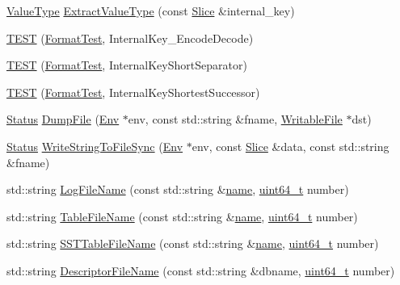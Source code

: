 \begin{DoxyCompactItemize}
\item 
\hyperlink{namespaceleveldb_acc038cb0d608414730cafa459a4ba866}{Value\+Type} \hyperlink{namespaceleveldb_a0c5a6ea40d7c0e87060a6e6d3ee393ec}{Extract\+Value\+Type} (const \hyperlink{classleveldb_1_1_slice}{Slice} \&internal\+\_\+key)
\item 
\hyperlink{namespaceleveldb_a0cb5db14747e016f18aa8684a485bc00}{T\+E\+S\+T} (\hyperlink{classleveldb_1_1_format_test}{Format\+Test}, Internal\+Key\+\_\+\+Encode\+Decode)
\item 
\hyperlink{namespaceleveldb_a88307bc8d4ac8ed2a4d1a530b24e255f}{T\+E\+S\+T} (\hyperlink{classleveldb_1_1_format_test}{Format\+Test}, Internal\+Key\+Short\+Separator)
\item 
\hyperlink{namespaceleveldb_abfb19a8fcd10a881d34dba3821434415}{T\+E\+S\+T} (\hyperlink{classleveldb_1_1_format_test}{Format\+Test}, Internal\+Key\+Shortest\+Successor)
\item 
\hyperlink{classleveldb_1_1_status}{Status} \hyperlink{namespaceleveldb_a119202f6323172b2ac45eae5baf7202f}{Dump\+File} (\hyperlink{classleveldb_1_1_env}{Env} $\ast$env, const std\+::string \&fname, \hyperlink{classleveldb_1_1_writable_file}{Writable\+File} $\ast$dst)
\item 
\hyperlink{classleveldb_1_1_status}{Status} \hyperlink{namespaceleveldb_aaa2ccf468819a9d769dd0bf38674a6e9}{Write\+String\+To\+File\+Sync} (\hyperlink{classleveldb_1_1_env}{Env} $\ast$env, const \hyperlink{classleveldb_1_1_slice}{Slice} \&data, const std\+::string \&fname)
\item 
std\+::string \hyperlink{namespaceleveldb_ae5aadcd574cc5186e7821177d44f4c6c}{Log\+File\+Name} (const std\+::string \&\hyperlink{testharness_8cc_a8f8f80d37794cde9472343e4487ba3eb}{name}, \hyperlink{stdint_8h_aaa5d1cd013383c889537491c3cfd9aad}{uint64\+\_\+t} number)
\item 
std\+::string \hyperlink{namespaceleveldb_ac9107e52d0ead114d749dc4b06dfd3ec}{Table\+File\+Name} (const std\+::string \&\hyperlink{testharness_8cc_a8f8f80d37794cde9472343e4487ba3eb}{name}, \hyperlink{stdint_8h_aaa5d1cd013383c889537491c3cfd9aad}{uint64\+\_\+t} number)
\item 
std\+::string \hyperlink{namespaceleveldb_aa3f12c506ffc9bf556b6cc2185313c1a}{S\+S\+T\+Table\+File\+Name} (const std\+::string \&\hyperlink{testharness_8cc_a8f8f80d37794cde9472343e4487ba3eb}{name}, \hyperlink{stdint_8h_aaa5d1cd013383c889537491c3cfd9aad}{uint64\+\_\+t} number)
\item 
std\+::string \hyperlink{namespaceleveldb_a1ea160b70b18dc85b537e16db3d6ddd0}{Descriptor\+File\+Name} (const std\+::string \&dbname, \hyperlink{stdint_8h_aaa5d1cd013383c889537491c3cfd9aad}{uint64\+\_\+t} number)

\end{DoxyCompactItemize}
